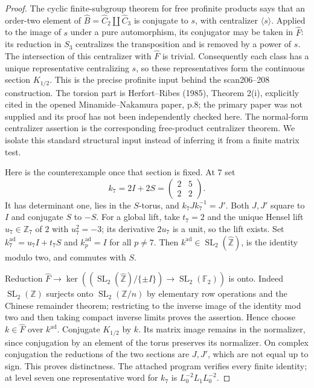 \begin{proof}
The cyclic finite-subgroup theorem for free profinite products says that an order-two element of $\widehat B=\widehat C_2\amalg\widehat C_3$ is conjugate to $s$, with centralizer $\langle s\rangle$. Applied to the image of $s$ under a pure automorphism, its conjugator may be taken in $\widehat F$: its reduction in $S_3$ centralizes the transposition and is removed by a power of $s$. The intersection of this centralizer with $\widehat F$ is trivial. Consequently each class has a unique representative centralizing $s$, so these representatives form the continuous section $K_{1/2}$. This is the precise profinite input behind the scan206--208 construction. The torsion part is Herfort--Ribes (1985), Theorem 2(i), explicitly cited in the opened Minamide--Nakamura paper, p.8; the primary paper was not supplied and its proof has not been independently checked here. The normal-form centralizer assertion is the corresponding free-product centralizer theorem. We isolate this standard structural input instead of inferring it from a finite matrix test.

Here is the counterexample once that section is fixed. At $7$ set
\[
 k_7=2I+2S=\begin{pmatrix}2&5\\2&2\end{pmatrix}.
\]
It has determinant one, lies in the $S$-torus, and $k_7Jk_7^{-1}=J'$. Both $J,J'$ square to $I$ and conjugate $S$ to $-S$. For a global lift, take $t_7=2$ and the unique Hensel lift $u_7\in\mathbb Z_7$ of $2$ with $u_7^2=-3$; its derivative $2u_7$ is a unit, so the lift exists. Set $k_7^{\mathrm{ad}}=u_7I+t_7S$ and $k_p^{\mathrm{ad}}=I$ for all $p\ne7$. Then $k^{\mathrm{ad}}\in\operatorname{SL}_2(\widehat{\mathbb Z})$, is the identity modulo two, and commutes with $S$.

Reduction $\widehat F\to\ker((\operatorname{SL}_2(\widehat{\mathbb Z})/\{\pm I\})\to\operatorname{SL}_2(\mathbb F_2))$ is onto. Indeed $\operatorname{SL}_2(\mathbb Z)$ surjects onto $\operatorname{SL}_2(\mathbb Z/n)$ by elementary row operations and the Chinese remainder theorem; restricting to the inverse image of the identity mod two and then taking compact inverse limits proves the assertion. Hence choose $k\in\widehat F$ over $k^{\mathrm{ad}}$. Conjugate $K_{1/2}$ by $k$. Its matrix image remains in the normalizer, since conjugation by an element of the torus preserves its normalizer. On complex conjugation the reductions of the two sections are $J,J'$, which are not equal up to sign. This proves distinctness. The attached program verifies every finite identity; at level seven one representative word for $k_7$ is $L_0^{-2}L_1L_0^{-2}$.
\end{proof}

